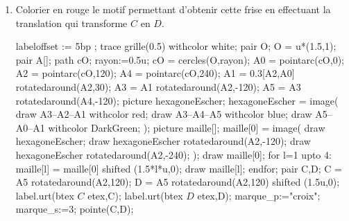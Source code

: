 \begin{exercice*}
    \begin{changemargin}{-5mm}{0mm}
        \begin{enumerate}
            \item Colorier en rouge le motif permettant d'obtenir cette frise en effectuant la translation qui transforme $C$ en $D$.\\
            \hspace*{-7mm}
            \begin{Geometrie}[CoinHD={(8u,3u)}]
                labeloffset := 5bp ;
                trace grille(0.5) withcolor white;
                pair O;
                O = u*(1.5,1);
                pair A[];
                path cO;
                rayon:=0.5u;
                cO = cercles(O,rayon);
                A0 = pointarc(cO,0);
                A2 = pointarc(cO,120);
                A4 = pointarc(cO,240);
                A1 = 0.3[A2,A0] rotatedaround(A2,30);
                A3 = A1 rotatedaround(A2,-120);
                A5 = A3 rotatedaround(A4,-120);        
                picture hexagoneEscher;
                hexagoneEscher = image(
                    draw A3--A2--A1 withcolor red;        
                        draw A3--A4--A5 withcolor blue;        
                        draw A5--A0--A1 withcolor DarkGreen;
                );
                picture maille[];
                maille[0] = image(
                    draw hexagoneEscher;
                    draw hexagoneEscher rotatedaround(A2,-120);
                    draw hexagoneEscher rotatedaround(A2,-240);
                );        
                draw maille[0];
                for l=1 upto 4:
                    maille[l] = maille[0] shifted (1.5*l*u,0);
                    draw maille[l];
                endfor;
                pair C,D;
                C = A5 rotatedaround(A2,120);
                D = A5 rotatedaround(A2,120) shifted (1.5u,0);
                label.urt(btex $C$ etex,C);
                label.urt(btex $D$ etex,D);
                marque_p:="croix";
                marque_s:=3;
                pointe(C,D);            

\end{Geometrie}
\end{enumerate}
\end{changemargin}
\end{exercice*}
